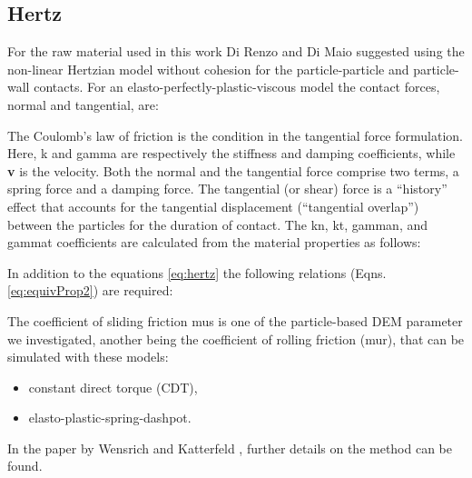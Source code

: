 \subsection{Hertz}
\label{subsec:hertz}

For the raw material used in this work 
Di Renzo and Di Maio \cite{RefWorks:145} suggested using the non-linear
Hertzian model without cohesion for the particle-particle and particle-wall contacts. 
For an elasto-perfectly-plastic-viscous model the contact forces, normal and
tangential, are:


The Coulomb's law of friction is the condition in the tangential force
formulation.\\
Here, \acs{k} and \acs{gamma} are respectively the stiffness and damping
coefficients, while \textbf{v} is the velocity.
Both the normal and the tangential
force comprise two terms, a spring force and a damping force. 
The tangential (or shear) force is a ``history'' effect that accounts for the
tangential displacement (``tangential overlap'') between the particles for the
duration of contact.
The \acs{kn}, \acs{kt}, \acs{gamman}, and \acs{gammat} coefficients are
calculated from the material properties as follows:

In addition to the equations \ref{eq:hertz} the following relations (Eqns. \ref{eq:equivProp2}) are required:


The coefficient of sliding friction \acs{mus} is 
one of the particle-based \acs{DEM} parameter we investigated, 
another being the coefficient of rolling friction (\acs{mur}),
that can be simulated with these models:
\begin{itemize}
  \item{constant direct torque (CDT),}
  \item{elasto-plastic-spring-dashpot.}
\end{itemize}

In the paper by Wensrich and Katterfeld \cite{RefWorks:87}, further details on
the method can be found.\\



% 


